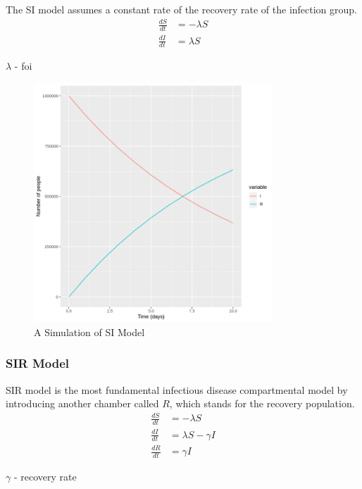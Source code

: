 \documentclass[a4paper, 12pt, twoside]{report}
\begin{document}
The SI model assumes a constant rate of the recovery rate of the infection group.
\begin{align}
	\frac{dS}{dt} & = - \lambda S \\
	\frac{dI}{dt} & = \lambda S
\end{align}

\begin{center}
$\lambda$ -  \gls{foi}\\
\end{center}

\begin{figure}[htpb]
	\centering
	\includegraphics[width=0.8\textwidth]{si-model}
	\caption{A Simulation of SI Model}
	\label{fig:si-model}
\end{figure}

\subsubsection{SIR Model}
SIR model is the most fundamental infectious disease compartmental model by introducing another chamber called $R$, which stands for the recovery population.
\begin{align}
	\frac{dS}{dt} & = - \lambda S          \\
	\frac{dI}{dt} & = \lambda S - \gamma I \\
	\frac{dR}{dt} & = \gamma I
\end{align}
\begin{center}
$\gamma$ - recovery rate \\
\end{center}
\end{document}
